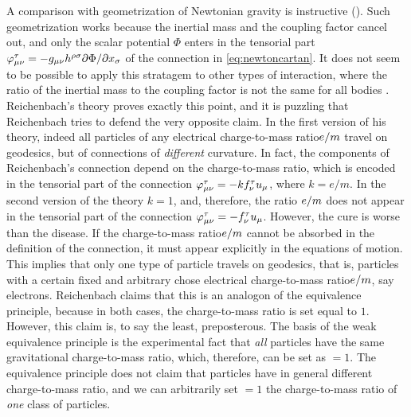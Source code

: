 \documentclass[submitted]{article}
\newcommand{\ctmr}{charge-to-mass ratio\xspace}
\newcommand{\ctmrf}{\ensuremath{\hfrac{e}{m}}\xspace}
\newcommand{\RTo}{\ensuremath{\varphi\tmn=-k f^\tau_\nu u_\mu}\xspace}
\newcommand{\RTt}{\ensuremath{\varphi\tmn=-f^\tau_\nu u_\mu}\xspace}
\newcommand{\FT}{\ensuremath{\varphi\tmn = - g_{\mu \nu} h^{\rho \sigma} \hfrac{\partial \Phi}{\partial x_\sigma}}\xspace}
\begin{document}
A comparison with  geometrization of Newtonian gravity is instructive (). Such geometrization works because the inertial mass and the coupling factor cancel out, and only the scalar potential $\Phi$ enters in the tensorial part \FT of the connection in \cref{eq:newtoncartan}. It does not seem to be possible to apply this stratagem to other types of interaction, where the ratio of the inertial mass to the coupling factor is not the same for all bodies . Reichenbach's theory proves exactly this point, and it is puzzling that Reichenbach tries to defend the very opposite claim. In the first version of his theory, indeed all particles of any electrical \ctmr \ctmrf travel on geodesics, but of connections of \emph{different} curvature. In fact, the components of Reichenbach's connection depend on the \ctmr, which is encoded in the tensorial part of the connection \RTo, where $k= e/m$. In the second version of the theory $k=1$, and, therefore, the ratio \ctmrf does not appear in the tensorial part of the connection \RTt. However, the cure is worse than the disease. If the \ctmr \ctmrf cannot be absorbed in the definition of the connection, it must appear explicitly in the equations of motion. This implies that only one type of particle travels on geodesics, that is, particles with a certain fixed and arbitrary chose electrical \ctmr \ctmrf, say electrons. Reichenbach claims that this is an analogon of the equivalence principle, because in both cases, the \ctmr is set equal to $1$. However, this claim is, to say the least, preposterous. The basis of the weak equivalence principle is the experimental fact that \emph{all} particles have the same gravitational \ctmr, which, therefore, can be set as $=1$. The equivalence principle does not claim that particles have in general different \ctmr, and we can arbitrarily set $=1$ the \ctmr of \emph{one} class of particles. 
\end{document}
